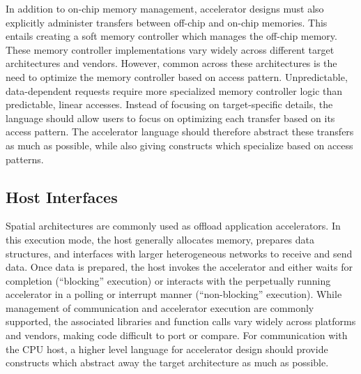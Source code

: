 In addition to on-chip memory management, accelerator designs must also explicitly administer transfers between off-chip and on-chip memories.
This entails creating a soft memory controller which manages the off-chip memory.
These memory controller implementations vary widely across different target architectures and vendors.
However, common across these architectures is the need to optimize the memory controller based on access pattern.
Unpredictable, data-dependent requests require more specialized memory controller logic than predictable, linear accesses.
Instead of focusing on target-specific details, the language should allow users to focus on optimizing each
transfer based on its access pattern.
The accelerator language should therefore abstract these transfers as much as possible, while also giving constructs which specialize based on access patterns.

\subsection{Host Interfaces}
Spatial architectures are commonly used as offload application accelerators.
In this execution mode, the host generally allocates memory, prepares data structures, and interfaces with larger heterogeneous networks to receive and send data.
Once data is prepared, the host invokes the accelerator and either waits for completion (``blocking'' execution)
or interacts with the perpetually running accelerator in a polling or interrupt manner (``non-blocking'' execution).
While management of communication and accelerator execution are commonly supported, the associated libraries and function calls vary widely across platforms and vendors, making code difficult to port or compare.
For communication with the CPU host, a higher level language for accelerator design should provide constructs which abstract away the target architecture as much as possible.


